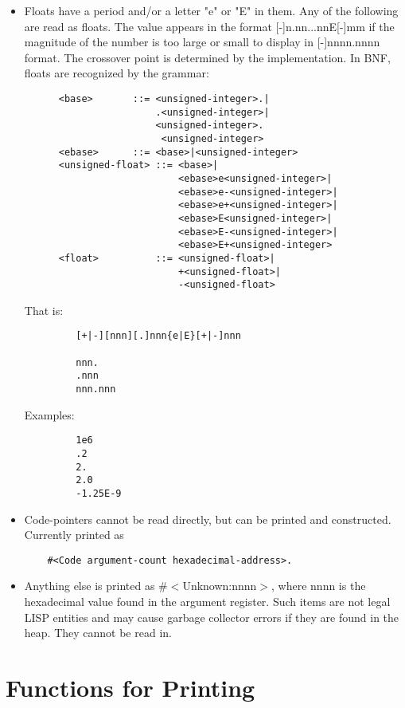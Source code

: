 \begin{itemize}
\item Floats have a period and/or a letter "e" or  "E"  in  them.
     Any of the following are read as floats.  The value appears
     in  the format [-]n.nn...nnE[-]mm  if the magnitude  of the
     number is    too    large  or    small  to    display    in
     [-]nnnn.nnnn    format.      The    crossover    point   is
     determined  by  the implementation.  In BNF,  floats    are
     recognized by the grammar:
\begin{verbatim}
      <base>       ::= <unsigned-integer>.|
                       .<unsigned-integer>|
                       <unsigned-integer>.
                      	<unsigned-integer>
      <ebase>      ::= <base>|<unsigned-integer>
      <unsigned-float> ::= <base>|
                           <ebase>e<unsigned-integer>|
                           <ebase>e-<unsigned-integer>|
                           <ebase>e+<unsigned-integer>|
                           <ebase>E<unsigned-integer>|
                           <ebase>E-<unsigned-integer>|
                           <ebase>E+<unsigned-integer>
      <float>          ::= <unsigned-float>|
                           +<unsigned-float>|
                           -<unsigned-float>
\end{verbatim}
     That is:
\begin{verbatim}
         [+|-][nnn][.]nnn{e|E}[+|-]nnn

         nnn.
         .nnn
         nnn.nnn
\end{verbatim}
     Examples:
\begin{verbatim}
         1e6
         .2
         2.
         2.0
         -1.25E-9
\end{verbatim}

\item Code-pointers  cannot  be read directly, but can be printed
     and   constructed.      Currently   printed    as   
\begin{verbatim}     
    #<Code argument-count hexadecimal-address>.
\end{verbatim}
\item Anything  else is printed as \#$<$Unknown:nnnn$>$, where nnnn is
     the hexadecimal value found in the argument register.  Such
     items are not legal LISP entities  and  may  cause  garbage
     collector  errors  if  they  are  found  in the heap.  They
     cannot be read in.
\end{itemize}

\section{Functions for Printing}

